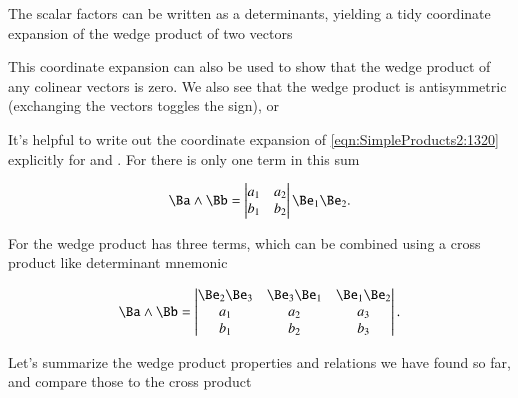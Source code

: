 The scalar factors can be written as a determinants, yielding a tidy coordinate expansion of the wedge product of two vectors


This coordinate expansion can also be used to show that the wedge product of any colinear vectors is zero.
We also see that the wedge product is antisymmetric (exchanging the vectors toggles the sign), or


It's helpful to write out the coordinate expansion of
\cref{eqn:SimpleProducts2:1320} explicitly for  and .
For  there is only one term in this sum

\begin{dmath}\label{eqn:SimpleProducts2:1720}
\Ba \wedge \Bb
=
\begin{vmatrix}
a_1 & a_2 \\
b_1 & b_2
\end{vmatrix}
\Be_1 \Be_2.
\end{dmath}

For  the wedge product has three terms, which can be combined using a cross product like determinant mnemonic

\begin{dmath}\label{eqn:SimpleProducts2:1740}
\Ba \wedge \Bb
=
\begin{vmatrix}
\Be_2 \Be_3 & \Be_3 \Be_1 & \Be_1 \Be_2 \\
a_1 & a_2 & a_3 \\
b_1 & b_2 & b_3 \\
\end{vmatrix}.
\end{dmath}

Let's summarize the wedge product properties and relations we have found so far, and compare those to the cross product

